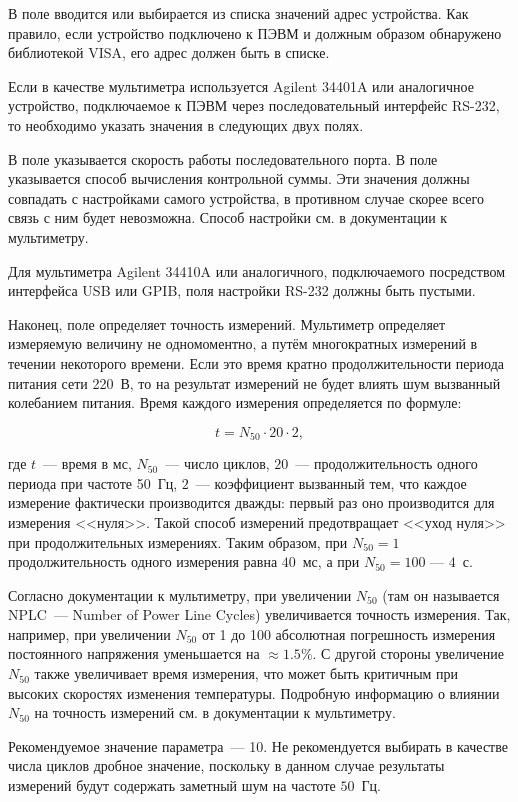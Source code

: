 В поле  вводится или выбирается из списка значений адрес устройства. Как правило, если устройство подключено к ПЭВМ и должным образом обнаружено библиотекой VISA, его адрес должен быть в списке.

\bigskip

Если в качестве мультиметра используется Agilent 34401A или аналогичное устройство, подключаемое к ПЭВМ через последовательный интерфейс RS-232, то необходимо указать значения в следующих двух полях.

В поле  указывается скорость работы последовательного порта. В поле  указывается способ вычисления контрольной суммы. Эти значения должны совпадать с настройками самого устройства, в противном случае скорее всего связь с ним будет невозможна. Способ настройки см. в документации к мультиметру.


Для мультиметра Agilent 34410A или аналогичного, подключаемого посредством интерфейса USB или GPIB, поля настройки RS-232 должны быть пустыми.

\bigskip

Наконец, поле  определяет точность измерений. Мультиметр определяет измеряемую величину не одномоментно, а путём многократных измерений в течении некоторого времени. Если это время кратно продолжительности периода питания сети 220~В, то на результат измерений не будет влиять шум вызванный колебанием питания. Время каждого измерения определяется по формуле:

\begin{equation}
t = N_{50} \cdot 20 \cdot 2,
\end{equation}

\noindent где $t$~--- время в мс, $N_{50}$~--- число циклов, $20$~--- продолжительность одного периода при частоте 50~Гц, $2$~--- коэффициент вызванный тем, что каждое измерение фактически производится дважды: первый раз оно производится для измерения <<нуля>>. Такой способ измерений предотвращает <<уход нуля>> при продолжительных измерениях. Таким образом, при $N_{50} = 1$ продолжительность одного измерения равна $40$~мс, а при $N_{50} = 100$ --- $4$~с.

Согласно документации к мультиметру, при увеличении $N_{50}$ (там он называется NPLC~--- Number of Power Line Cycles) увеличивается точность измерения. Так, например, при увеличении $N_{50}$ от 1 до 100 абсолютная погрешность измерения постоянного напряжения уменьшается на $\approx 1.5\%$. С другой стороны увеличение $N_{50}$ также увеличивает время измерения, что может быть критичным при высоких скоростях изменения температуры. Подробную информацию о влиянии $N_{50}$ на точность измерений см. в документации к мультиметру.

Рекомендуемое значение параметра~--- 10. Не рекомендуется выбирать в качестве числа циклов дробное значение, поскольку в данном случае результаты измерений будут содержать заметный шум на частоте $50$~Гц.
